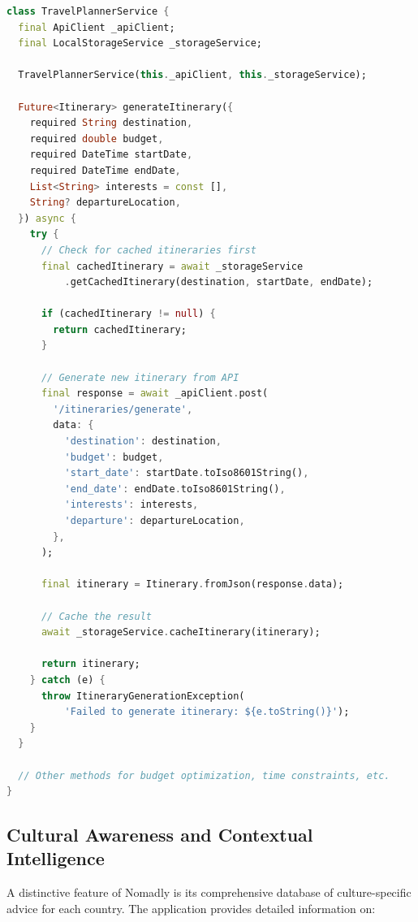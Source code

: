 \documentclass[11pt, a4paper]{article}
\begin{document}
\begin{lstlisting}[language=Dart, caption=Simplified TravelPlannerService Implementation]
class TravelPlannerService {
  final ApiClient _apiClient;
  final LocalStorageService _storageService;
  
  TravelPlannerService(this._apiClient, this._storageService);
  
  Future<Itinerary> generateItinerary({
    required String destination,
    required double budget,
    required DateTime startDate,
    required DateTime endDate,
    List<String> interests = const [],
    String? departureLocation,
  }) async {
    try {
      // Check for cached itineraries first
      final cachedItinerary = await _storageService
          .getCachedItinerary(destination, startDate, endDate);
      
      if (cachedItinerary != null) {
        return cachedItinerary;
      }
      
      // Generate new itinerary from API
      final response = await _apiClient.post(
        '/itineraries/generate',
        data: {
          'destination': destination,
          'budget': budget,
          'start_date': startDate.toIso8601String(),
          'end_date': endDate.toIso8601String(),
          'interests': interests,
          'departure': departureLocation,
        },
      );
      
      final itinerary = Itinerary.fromJson(response.data);
      
      // Cache the result
      await _storageService.cacheItinerary(itinerary);
      
      return itinerary;
    } catch (e) {
      throw ItineraryGenerationException(
          'Failed to generate itinerary: ${e.toString()}');
    }
  }
  
  // Other methods for budget optimization, time constraints, etc.
}
\end{lstlisting}

\subsection{Cultural Awareness and Contextual Intelligence}

A distinctive feature of Nomadly is its comprehensive database of culture-specific advice for each country. The application provides detailed information on:
\end{document}

